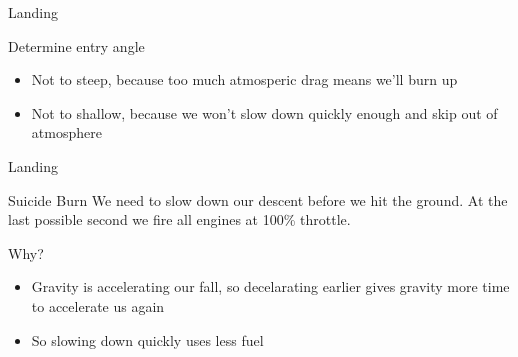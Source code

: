 {
%
\begin{frame}
\end{frame}
\begin{frame}[t]{Landing}
    \begin{block}{Determine entry angle}
        \begin{itemize}
            \item Not to steep, because too much atmosperic drag means we'll burn up
            \item Not to shallow, because we won't slow down quickly enough and skip out of atmosphere
        \end{itemize}
    \end{block}
\end{frame}
\begin{frame}[t]{Landing}
    \begin{block}{Suicide Burn}
        We need to slow down our descent before we hit the ground. At the last possible second we fire all engines at 100\% throttle.
    \end{block}
    \begin{block}{Why?}
        \begin{itemize}
            \item Gravity is accelerating our fall, so decelarating earlier gives gravity more time to accelerate us again
            \item So slowing down quickly uses less fuel
        \end{itemize}
    \end{block}
\end{frame}
}
